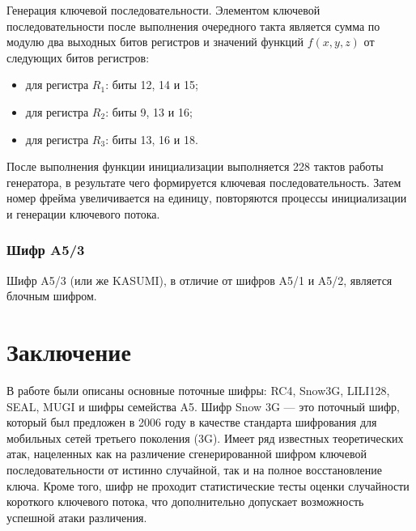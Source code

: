 \documentclass{./civarticle}
\begin{document}
Генерация ключевой последовательности. Элементом ключевой последовательности после выполнения очередного такта является сумма по модулю два выходных битов регистров и значений функций $f(x, y, z)$ от следующих битов регистров: \begin{itemize}
    \item для регистра $R_1$: биты 12, 14 и 15;
    \item для регистра $R_2$: биты 9, 13 и 16;
    \item для регистра $R_3$: биты 13, 16 и 18.
\end{itemize}
После выполнения функции инициализации выполняется 228 тактов работы генератора, в результате чего формируется ключевая последовательность. Затем номер фрейма увеличивается на единицу, повторяются процессы инициализации и генерации ключевого потока.

\subsubsection{Шифр A5/3}
Шифр A5/3 (или же KASUMI), в отличие от шифров A5/1 и A5/2, является блочным шифром.


\section{Заключение}

В работе были описаны основные поточные шифры: RC4, Snow3G, LILI128, SEAL, MUGI и шифры семейства A5. Шифр Snow 3G — это поточный шифр, который был предложен в 2006 году в качестве стандарта шифрования для мобильных сетей третьего поколения (3G). Имеет ряд известных теоретических атак, нацеленных как на различение сгенерированной шифром ключевой последовательности от истинно случайной, так и на полное восстановление ключа. Кроме того, шифр не проходит статистические тесты оценки случайности короткого ключевого потока, что дополнительно допускает возможность успешной атаки различения.
\end{document}
